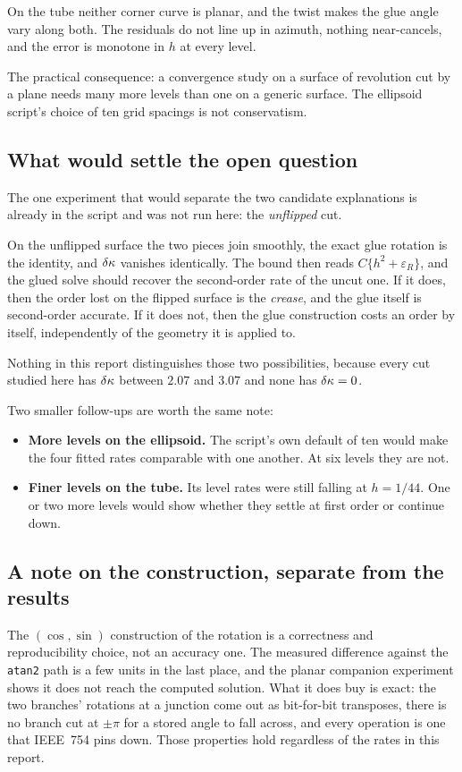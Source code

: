 On the tube neither corner curve is planar, and the twist makes the glue
angle vary along both. The residuals do not line up in azimuth, nothing
near-cancels, and the error is monotone in $h$ at every level.

The practical consequence: a convergence study on a surface of revolution
cut by a plane needs many more levels than one on a generic surface. The
ellipsoid script's choice of ten grid spacings is not conservatism.

\subsection{What would settle the open question}

The one experiment that would separate the two candidate explanations is
already in the script and was not run here: the \emph{unflipped} cut.

On the unflipped surface the two pieces join smoothly, the exact glue
rotation is the identity, and $\delta\kappa$ vanishes identically. The bound then
reads $C\{h^2 + \varepsilon_R\}$, and the glued solve should recover the
second-order rate of the uncut one. If it does, then the order lost on
the flipped surface is the \emph{crease}, and the glue itself is
second-order accurate. If it does not, then the glue construction costs
an order by itself, independently of the geometry it is applied to.

Nothing in this report distinguishes those two possibilities, because
every cut studied here has $\delta\kappa$ between $2.07$ and $3.07$ and none has
$\delta\kappa = 0$.

Two smaller follow-ups are worth the same note:

\begin{itemize}
  \item \textbf{More levels on the ellipsoid.} The script's own default
        of ten would make the four fitted rates comparable with one
        another. At six levels they are not.
  \item \textbf{Finer levels on the tube.} Its level rates were still
        falling at $h=1/44$. One or two more levels would show whether
        they settle at first order or continue down.
\end{itemize}

\subsection{A note on the construction, separate from the results}

The $(\cos,\sin)$ construction of the rotation is a correctness and
reproducibility choice, not an accuracy one. The measured difference
against the \texttt{atan2} path is a few units in the last place, and the
planar companion experiment shows it does not reach the computed
solution. What it does buy is exact: the two branches' rotations at a
junction come out as bit-for-bit transposes, there is no branch cut at
$\pm\pi$ for a stored angle to fall across, and every operation is one
that IEEE~754 pins down. Those properties hold regardless of the rates in
this report.

